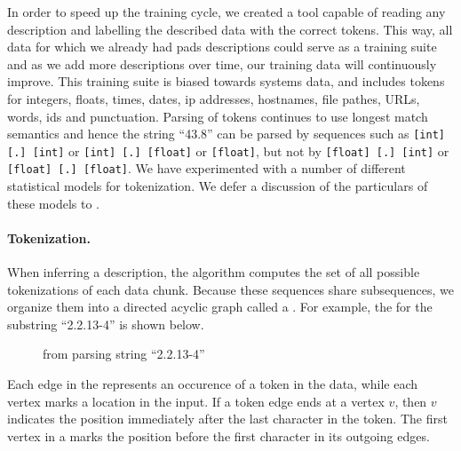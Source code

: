 In order to speed up the training cycle, we created a tool
capable of reading any \pads{} description and labelling the
described data with the correct tokens.  This way,
all data for which we already had pads descriptions could serve as a training
suite and as we add more descriptions over time, our training data will 
continuously improve.  This training suite is biased towards systems 
data, and includes
tokens for integers, floats, times, dates, ip addresses, hostnames, 
file pathes, URLs, words, ids and punctuation. 
Parsing of tokens continues to use longest match semantics
and hence the string ``43.8'' can be parsed by sequences such as
{\tt [int] [.] [int]} or {\tt [int] [.] [float]} or {\tt [float]},
but not by {\tt [float] [.] [int]} or {\tt [float] [.] [float]}.
We have experimented with a number of different statistical models for
tokenization.  We defer a discussion of the particulars of these
models to .

\paragraph*{Tokenization.}

When inferring a description, the algorithm computes the set of all
possible tokenizations of each data chunk.  Because these sequences
share subsequences, we organize them into a directed acyclic graph
called a \seqset{}.  For example, the \seqset{} for the substring 
``2.2.13-4'' is shown below.


\begin{figure}[th]
\begin{center}
\shrink
{}
\end{center}
\caption{\seqset{} from parsing string ``2.2.13-4''}\label{fig:seqset}
\shrink
\end{figure}

\noindent
Each edge in the \seqset{} represents an occurence of a token in the
data, while each vertex marks a location in the input.  If a token
edge ends at a vertex $v$, then $v$ indicates the position immediately
after the last character in the token.  The first vertex in a
\seqset{} marks the position before the first character in its
outgoing edges. 

